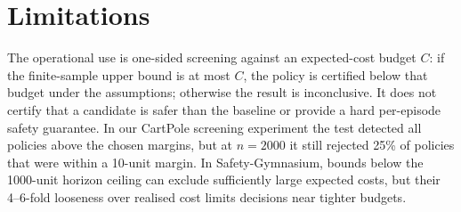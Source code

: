 \documentclass{article}
\begin{document}
\section{Limitations}
\label{sec:limits}

The operational use is one-sided screening against an expected-cost budget $C$: if the finite-sample upper bound is at most $C$, the policy is certified below that budget under the assumptions; otherwise the result is inconclusive. It does not certify that a candidate is safer than the baseline or provide a hard per-episode safety guarantee. In our CartPole screening experiment the test detected all policies above the chosen margins, but at $n=2000$ it still rejected 25\% of policies that were within a 10-unit margin. In Safety-Gymnasium, bounds below the 1000-unit horizon ceiling can exclude sufficiently large expected costs, but their 4--6-fold looseness over realised cost limits decisions near tighter budgets.
\end{document}
